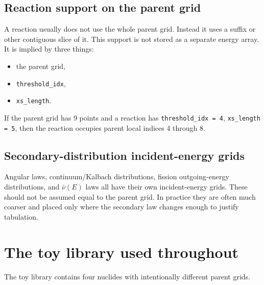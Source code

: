 \documentclass[11pt,a4paper]{article}
\begin{document}
\subsection{Reaction support on the parent grid}
A reaction usually does not use the whole parent grid. Instead it uses a suffix or other contiguous slice of it. This support is not stored as a separate energy array. It is implied by three things:
\begin{itemize}[leftmargin=1.4em]
  \item the parent grid,
  \item \texttt{threshold\_idx},
  \item \texttt{xs\_length}.
\end{itemize}
If the parent grid has 9 points and a reaction has \texttt{threshold\_idx = 4}, \texttt{xs\_length = 5}, then the reaction occupies parent local indices 4 through 8.

\subsection{Secondary-distribution incident-energy grids}
Angular laws, continuum/Kalbach distributions, fission outgoing-energy distributions, and $\bar\nu(E)$ laws all have their own incident-energy grids. These should not be assumed equal to the parent grid. In practice they are often much coarser and placed only where the secondary law changes enough to justify tabulation.


\section{The toy library used throughout}
The toy library contains four nuclides with intentionally different parent grids.
\end{document}
